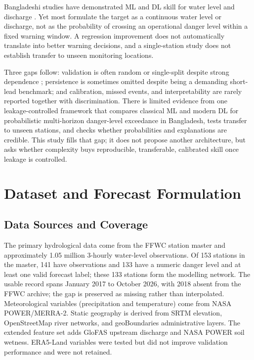 \documentclass[conference]{IEEEtran}
\begin{document}
Bangladeshi studies have demonstrated ML and DL skill for water level and discharge \cite{noor2022water,islam2026climate,islam2025comparative}. Yet most formulate the target as a continuous water level or discharge, not as the probability of crossing an operational danger level within a fixed warning window. A regression improvement does not automatically translate into better warning decisions, and a single-station study does not establish transfer to unseen monitoring locations.

Three gaps follow: validation is often random or single-split despite strong dependence \cite{roberts2017cross}; persistence is sometimes omitted despite being a demanding short-lead benchmark; and calibration, missed events, and interpretability are rarely reported together with discrimination. There is limited evidence from one leakage-controlled framework that compares classical ML and modern DL for probabilistic multi-horizon danger-level exceedance in Bangladesh, tests transfer to unseen stations, and checks whether probabilities and explanations are credible. This study fills that gap; it does not propose another architecture, but asks whether complexity buys reproducible, transferable, calibrated skill once leakage is controlled.

\section{Dataset and Forecast Formulation}

\subsection{Data Sources and Coverage}

The primary hydrological data come from the FFWC station master and approximately 1.05 million 3-hourly water-level observations. Of 153 stations in the master, 141 have observations and 133 have a numeric danger level and at least one valid forecast label; these 133 stations form the modelling network. The usable record spans January 2017 to October 2026, with 2018 absent from the FFWC archive; the gap is preserved as missing rather than interpolated. Meteorological variables (precipitation and temperature) come from NASA POWER/MERRA-2. Static geography is derived from SRTM elevation, OpenStreetMap river networks, and geoBoundaries administrative layers. The extended feature set adds GloFAS upstream discharge and NASA POWER soil wetness. ERA5-Land variables were tested but did not improve validation performance and were not retained.
\end{document}
